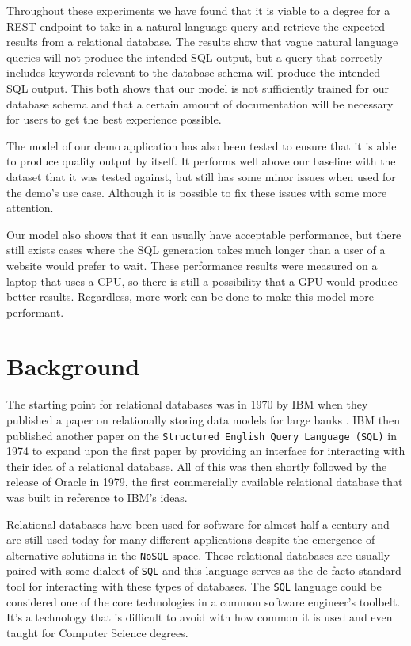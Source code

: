 \documentclass[11pt]{article}
\begin{document}
Throughout these experiments we have found that it is viable to a degree for a REST endpoint to take in a natural language query and retrieve the expected results from a relational database. The results show that vague natural language queries will not produce the intended SQL output, but a query that correctly includes keywords relevant to the database schema will produce the intended SQL output. This both shows that our model is not sufficiently trained for our database schema and that a certain amount of documentation will be necessary for users to get the best experience possible.

The model of our demo application has also been tested to ensure that it is able to produce quality output by itself. It performs well above our baseline with the dataset that it was tested against, but still has some minor issues when used for the demo's use case. Although it is possible to fix these issues with some more attention.

Our model also shows that it can usually have acceptable performance, but there still exists cases where the SQL generation takes much longer than a user of a website would prefer to wait. These performance results were measured on a laptop that uses a CPU, so there is still a possibility that a GPU would produce better results. Regardless, more work can be done to make this model more performant.

\section{Background}

The starting point for relational databases was in 1970 by IBM when they published a paper on relationally storing data models for large banks \citep{rdbms}. IBM then published another paper on the \texttt{Structured English Query Language (SQL)} \citep{sql} in 1974 to expand upon the first paper by providing an interface for interacting with their idea of a relational database. All of this was then shortly followed by the release of Oracle in 1979, the first commercially available relational database that was built in reference to IBM's ideas.

Relational databases have been used for software for almost half a century and are still used today for many different applications despite the emergence of alternative solutions in the \texttt{NoSQL} space. These relational databases are usually paired with some dialect of \texttt{SQL} and this language serves as the de facto standard tool for interacting with these types of databases. The \texttt{SQL} language could be considered one of the core technologies in a common software engineer's toolbelt. It's a technology that is difficult to avoid with how common it is used and even taught for Computer Science degrees.
\end{document}

